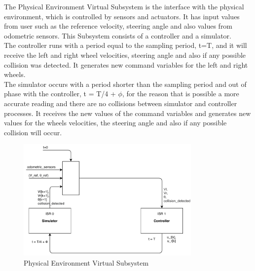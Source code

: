 The Physical Environment Virtual Subsystem is the interface with the physical environment, which is controlled by sensors and actuators. It has input values from user such as the reference velocity, steering angle and also values from odometric sensors. This Subsystem consists of a controller and a simulator. \\
	The controller runs with a period equal to the sampling period, t=T, and it will receive the left and right wheel velocities, steering angle and also if any possible collision was detected. It generates new command variables for the left and right wheels.\\
	The simulator occurs with a period shorter than the sampling period and out of phase with the controller, t = T/4 + $\phi$, for the reason that is possible a more accurate reading and there are no collisions between simulator and controller processes. It receives the new values of the command variables and generates new values for the wheels velocities, the steering angle and also if any possible collision will occur.

\begin{figure}[!htbp]
\centering
       \includegraphics[width=0.8\textwidth]{img/sim&control.pdf} 
\caption{Physical Environment Virtual Subsystem}%
\label{fig:simcontroller}
\end{figure}
%
